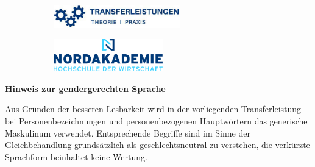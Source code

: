 \pagebreak
\thispagestyle{empty}

\setlength{\parindent}{0pt}

\begin{figure}[t]
	\vspace*{-2.9\baselineskip}
	\begin{subfigure}[b]{0.6\textwidth}
		\includegraphics[height=1cm, left]{image/transferleistung}
	\end{subfigure}
	\begin{subfigure}[b]{0.4\textwidth}
		\includegraphics[height=1.4cm, right]{image/nak_new_logo_big}
	\end{subfigure}
\end{figure}
\begin{figure}[t]
\end{figure}


\vspace*{\fill}

\large
\textcolor{blue!30!black}{\textbf{Hinweis zur gendergerechten Sprache}}
\newline

\normalsize
Aus Gründen der besseren Lesbarkeit wird in der vorliegenden Transferleistung bei Personenbezeichnungen und personenbezogenen Hauptwörtern das generische Maskulinum verwendet. Entsprechende Begriffe sind im Sinne der Gleichbehandlung grundsätzlich als geschlechtsneutral zu verstehen, die verkürzte Sprachform beinhaltet keine Wertung.

\vspace*{\fill}
